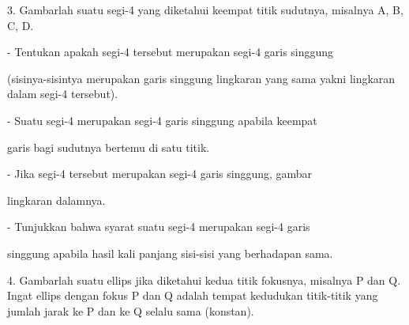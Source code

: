 \documentclass[a4paper,10pt]{article}
\begin{document}
\begin{eulernotebook}
\begin{eulercomment}
\begin{eulercomment}
\begin{eulercomment}
\begin{eulercomment}
\begin{eulercomment}
\begin{eulercomment}
\begin{eulercomment}
3. Gambarlah suatu segi-4 yang diketahui keempat titik sudutnya,
misalnya A, B, C, D.\\
\end{eulercomment}
\begin{eulerttcomment}
   - Tentukan apakah segi-4 tersebut merupakan segi-4 garis singgung
\end{eulerttcomment}
\begin{eulercomment}
(sisinya-sisintya merupakan garis singgung lingkaran yang sama yakni
lingkaran dalam segi-4 tersebut).\\
\end{eulercomment}
\begin{eulerttcomment}
   - Suatu segi-4 merupakan segi-4 garis singgung apabila keempat
\end{eulerttcomment}
\begin{eulercomment}
garis bagi sudutnya bertemu di satu titik.\\
\end{eulercomment}
\begin{eulerttcomment}
   - Jika segi-4 tersebut merupakan segi-4 garis singgung, gambar
\end{eulerttcomment}
\begin{eulercomment}
lingkaran dalamnya.\\
\end{eulercomment}
\begin{eulerttcomment}
   - Tunjukkan bahwa syarat suatu segi-4 merupakan segi-4 garis
\end{eulerttcomment}
\begin{eulercomment}
singgung apabila hasil kali panjang sisi-sisi yang berhadapan sama.

4. Gambarlah suatu ellips jika diketahui kedua titik fokusnya,
misalnya P dan Q. Ingat ellips dengan fokus P dan Q adalah tempat
kedudukan titik-titik yang jumlah jarak ke P dan ke Q selalu sama
(konstan).


\end{eulercomment}
\end{eulercomment}
\end{eulercomment}
\end{eulercomment}
\end{eulercomment}
\end{eulercomment}
\end{eulercomment}
\end{eulernotebook}
\end{document}
